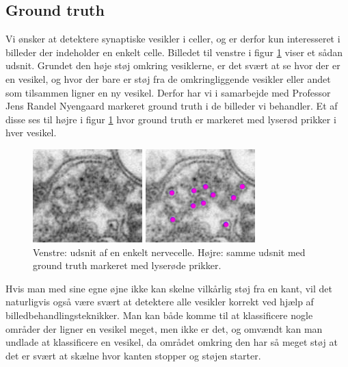 \subsection{Ground truth}				
Vi ønsker at detektere synaptiske vesikler i celler, og er derfor kun interesseret i billeder der indeholder en enkelt celle. Billedet til venstre i figur \ref{fig:intro_celle_groundtruth} viser et sådan udsnit. Grundet den høje støj omkring vesiklerne, er det svært at se hvor der er en vesikel, og hvor der bare er støj fra de omkringliggende vesikler eller andet som tilsammen ligner en ny vesikel. Derfor har vi i samarbejde med Professor Jens Randel Nyengaard markeret ground truth i de billeder vi behandler. Et af disse ses til højre i figur \ref{fig:intro_celle_groundtruth} hvor ground truth er markeret med lyserød prikker i hver vesikel.

\begin{figure}[H]
	\begin{minipage}[b]{0.5\linewidth}
		\centering
		\includegraphics[scale=1.5]{files/intro/img/celle.png}
	\end{minipage}
	\hspace{0.5cm}
	\begin{minipage}[b]{0.5\linewidth}
		\centering
		\includegraphics[scale=1.5]{files/intro/img/celle_groundtruth.png}
	\end{minipage}
	\caption{Venstre: udsnit af en enkelt nervecelle. Højre: samme udsnit med ground truth markeret med lyserøde prikker.\label{fig:intro_celle_groundtruth}}
\end{figure}

Hvis man med sine egne øjne ikke kan skelne vilkårlig støj fra en kant, vil det naturligvis også være svært at detektere alle vesikler korrekt ved hjælp af billedbehandlingsteknikker. Man kan både komme til at klassificere nogle områder der ligner en vesikel meget, men ikke er det, og omvændt kan man undlade at klassificere en vesikel, da området omkring den har så meget støj at det er svært at skælne hvor kanten stopper og støjen starter. 

